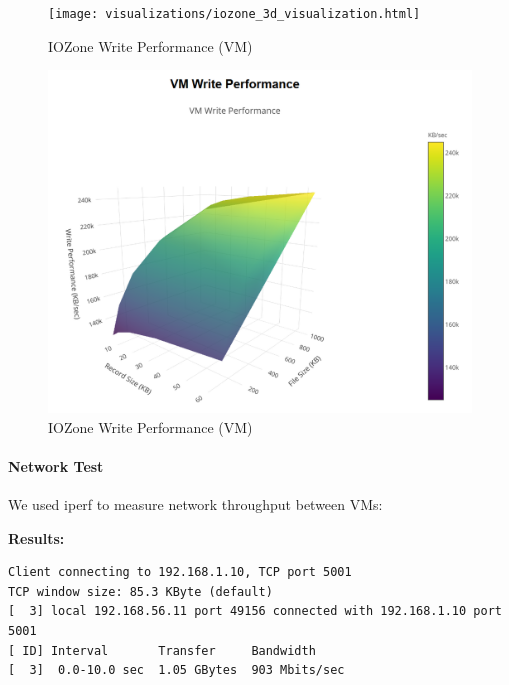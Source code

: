 \begin{figure}
\centering
\texttt{[image: visualizations/iozone\_3d\_visualization.html]}
\caption{IOZone Write Performance (VM)}
\end{figure}

\begin{figure}
\centering
\includegraphics{visualizations/IOZONE-VM.png}
\caption{IOZone Write Performance (VM)}
\end{figure}

\hypertarget{network-test}{%
\paragraph{Network Test}\label{network-test}}

We used iperf to measure network throughput between VMs:

\begin{Shaded}
\begin{Highlighting}[]
 

 
\end{Highlighting}
\end{Shaded}

\textbf{Results:}

\begin{verbatim}
Client connecting to 192.168.1.10, TCP port 5001
TCP window size: 85.3 KByte (default)
[  3] local 192.168.56.11 port 49156 connected with 192.168.1.10 port 5001
[ ID] Interval       Transfer     Bandwidth
[  3]  0.0-10.0 sec  1.05 GBytes  903 Mbits/sec
\end{verbatim}

